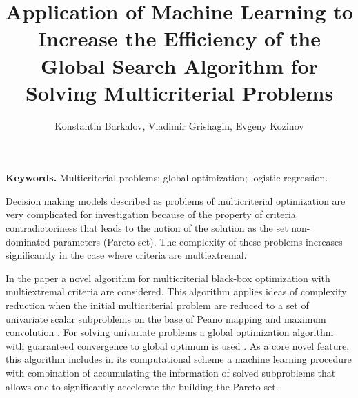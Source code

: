 \documentclass[oribibl]{llncs}
\begin{document}
\cleardoublepage

\title{Application of Machine Learning to Increase the Efficiency of the Global Search Algorithm for Solving Multicriterial Problems}
\author{Konstantin Barkalov, Vladimir Grishagin, Evgeny Kozinov}



\maketitle

\thispagestyle{fancy}

\textbf{Keywords.} Multicriterial problems; global optimization; logistic regression. %

 \vspace*{0.5cm}


Decision making models described as problems of multicriterial optimization are very complicated for investigation because of the property of criteria contradictoriness that leads to the notion of the solution as the set non-dominated parameters (Pareto set). The complexity of these problems increases significantly in the case where criteria are multiextremal. 

In the paper a novel algorithm for multicriterial black-box optimization with multiextremal criteria are considered. This algorithm applies ideas of complexity reduction when the initial multicriterial problem are reduced to a set of univariate scalar subproblems on the base of Peano mapping and maximum convolution \cite{Gergel2018}.
For solving univariate problems a global optimization algorithm with guaranteed convergence to global optimum is used \cite{Sergeyev2013}. As a core novel feature, this algorithm includes in its computational scheme a machine learning procedure with combination of accumulating the information of solved subproblems that allows one to significantly accelerate the building the Pareto set.
\end{document}
